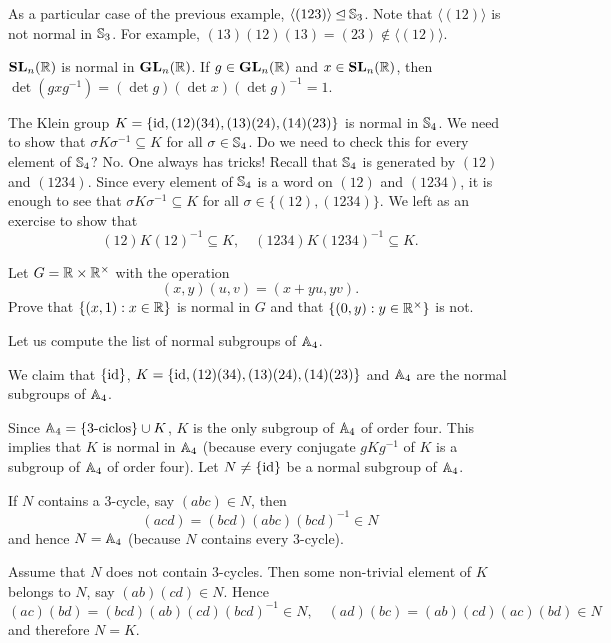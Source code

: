 \begin{example}
As a particular case of the previous example, 
$\langle (123)\rangle\unlhd\mathbb{S}_3$. Note that
$\langle (12)\rangle$ is not normal in $\mathbb{S}_3$.  
For example, $(13)(12)(13)=(23)\not\in\langle(12)\rangle$.
\end{example}

\begin{example}
$\mathbf{SL}_n(\mathbb{R})$ is normal in $\mathbf{GL}_n(\mathbb{R})$. If $g\in\mathbf{GL}_n(\mathbb{R})$ and $x\in\mathbf{SL}_n(\mathbb{R})$, then $\det(gxg^{-1})=(\det g)(\det x)(\det g)^{-1}=1$.
\end{example}

\begin{example}
The Klein group $K=\{\operatorname{id},(12)(34),(13)(24),(14)(23)\}$ is normal in
$\mathbb{S}_4$. We need to show that 
$\sigma K\sigma^{-1}\subseteq K$ for all $\sigma\in\mathbb{S}_4$. Do we need to check this for every element of $\mathbb{S}_4$? No. One always has tricks! 
Recall that $\mathbb{S}_4$ is generated by $(12)$ and $(1234)$. Since
every element of  $\mathbb{S}_4$ is a word on $(12)$ and 
$(1234)$,
it is enough to see that
$\sigma K\sigma^{-1}\subseteq K$ for all $\sigma\in\{(12),(1234)\}$. We left as an exercise to show that 
\[
(12)K(12)^{-1}\subseteq K,\quad
(1234)K(1234)^{-1}\subseteq K.
\]
\end{example}

\begin{exercise}
Let $G=\mathbb{R}\times\mathbb{R}^\times$ with the operation 
\[
(x,y)(u,v)=(x+yu,yv).
\]
Prove that $\{(x,1):x\in\mathbb{R}\}$ is normal in $G$ and that
$\{(0,y):y\in\mathbb{R}^\times\}$ is not. 
\end{exercise}

Let us compute the list of normal subgroups of $\mathbb{A}_4$.

\begin{example}
We claim that 
$\{\operatorname{id}\}$, $K=\{\operatorname{id},(12)(34),(13)(24),(14)(23)\}$ and $\mathbb{A}_4$ 
are the normal subgroups of $\mathbb{A}_4$.

Since $\mathbb{A}_4=\{\text{3-ciclos}\}\cup K$, $K$ is the only subgroup
of $\mathbb{A}_4$ of order four. This implies that $K$ is normal in $\mathbb{A}_4$ (because every conjugate $gKg^{-1}$ of $K$ is a subgroup of 
$\mathbb{A}_4$ of order four). Let $N\ne\{\operatorname{id}\}$ be a normal subgroup of 
$\mathbb{A}_4$. 

If $N$ contains a 3-cycle, say 
$(abc)\in N$, then 
\[
(acd)=(bcd)(abc)(bcd)^{-1}\in N
\]
and hence $N=\mathbb{A}_4$ (because $N$ contains every 3-cycle). 

Assume that $N$ does not contain 3-cycles. 
Then some non-trivial element of $K$ belongs to $N$, say 
$(ab)(cd)\in N$. Hence 
\[
(ac)(bd)=(bcd)(ab)(cd)(bcd)^{-1}\in N,\quad
(ad)(bc)=(ab)(cd)(ac)(bd)\in N
\]
and therefore $N=K$.
\end{example}

